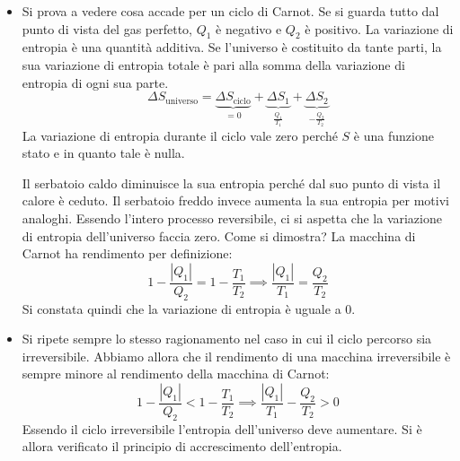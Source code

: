 \documentclass[10pt,a4paper]{book}
\begin{document}
\FloatBarrier
\begin{itemize}
	\item Si prova a vedere cosa accade per un ciclo di Carnot. Se si guarda tutto dal punto di vista del gas perfetto, $Q_1$ è negativo e $Q_2$ è positivo. La variazione di entropia è una quantità additiva. Se l'universo è costituito da tante parti, la sua variazione di entropia totale è pari alla somma della variazione di entropia di ogni sua parte.
	\[
		\Delta S_{\text{universo}} = \underbrace{\Delta S_{\text{ciclo}}}_{=0} + \underbrace{\Delta S_1}_{\frac{Q_1 }{T_1 }} + \underbrace{\Delta S_2}_{-\frac{Q_2 }{T_2 }}
	\]
	La variazione di entropia durante il ciclo vale zero perché $S$ è una funzione stato e in quanto tale è nulla.
	
	Il serbatoio caldo diminuisce la sua entropia perché dal suo punto di vista il calore è ceduto. Il serbatoio freddo invece aumenta la sua entropia per motivi analoghi. Essendo l'intero processo reversibile, ci si aspetta che la variazione di entropia dell'universo faccia zero. Come si dimostra?  La macchina di Carnot ha rendimento per definizione:
	\[
		1 - \frac{|Q_1|}{Q_2 } = 1 - \frac{T_1 }{T_2 } \implies \frac{|Q_1|}{T_1 } = \frac{Q_2 }{T_2 }
	\]
	Si constata quindi che la variazione di entropia è uguale a $0$.
	\item Si ripete sempre lo stesso ragionamento nel caso in cui il ciclo percorso sia irreversibile. Abbiamo allora che il rendimento di una macchina irreversibile è sempre minore al rendimento della macchina di Carnot:
	\[
		1 - \frac{|Q_1|}{Q_2 } < 1 - \frac{T_1 }{T_2 } \implies \frac{|Q_1|}{T_1 } - \frac{Q_2 }{T_2 } > 0
	\]
	Essendo il ciclo irreversibile l'entropia dell'universo deve aumentare. Si è allora verificato il principio di accrescimento dell'entropia.
\end{itemize}
\end{document}
